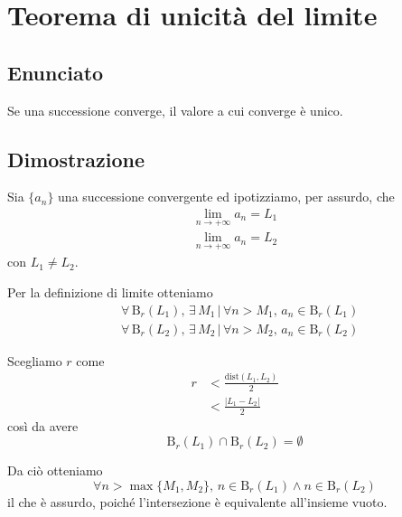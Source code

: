 \documentclass[../../dimostrazioni]{subfiles}
\begin{document}
    \chapter{Teorema di unicità del limite}

        \section*{Enunciato}

            Se una successione converge, il valore a cui converge è unico.

        \section*{Dimostrazione}

            Sia \(\{a_n\}\) una successione convergente ed ipotizziamo, per assurdo, che
            \begin{align*}
                \lim_{n \to +\infty} a_n = L_1\\
                \lim_{n \to +\infty} a_n = L_2
            \end{align*}
            con \(L_1 \neq L_2\).

            Per la definizione di limite otteniamo
            \begin{align*}
                &\forall \, \mathrm{B}_r (L_1), \, \exists \, M_1 \, | \, \forall n > M_1, \, a_n \in \mathrm{B}_r (L_1)\\
                &\forall \, \mathrm{B}_r (L_2), \, \exists \, M_2 \, | \, \forall n > M_2, \, a_n \in \mathrm{B}_r (L_2)
            \end{align*}

            Scegliamo \(r\) come
            \begin{align*}
                r &< \frac{\mathrm{dist} (L_1, L_2)}{2}\\
                &< \frac{|L_1 - L_2|}{2}
            \end{align*}
            così da avere
            \[
                \mathrm{B}_r (L_1) \cap \mathrm{B}_r (L_2) = \emptyset
            \]

            Da ciò otteniamo
            \[
                \forall n > \max\{M_1, M_2\}, \, n \in \mathrm{B}_r (L_1) \land n \in \mathrm{B}_r (L_2)
            \]
            il che è assurdo, poiché l'intersezione è equivalente all'insieme vuoto.
    
\end{document}
